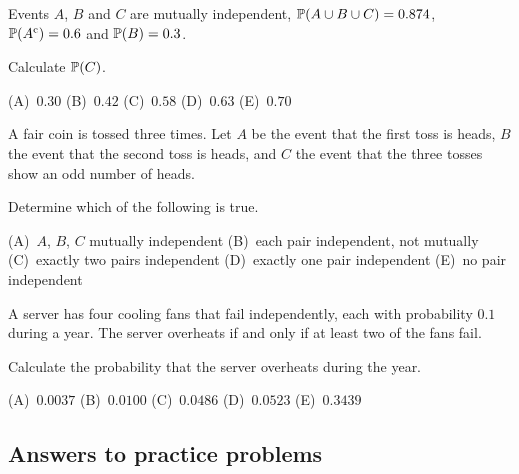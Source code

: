 \begin{practice}
Events $A$, $B$ and $C$ are mutually independent, $\mathbb{P}(A \cup B \cup C) = 0.874$, $\mathbb{P}(A^{\mathrm{c}}) = 0.6$ and $\mathbb{P}(B) = 0.3$.

Calculate $\mathbb{P}(C)$.

\begin{center}
(A)~$0.30$ \quad (B)~$0.42$ \quad (C)~$0.58$ \quad (D)~$0.63$ \quad (E)~$0.70$
\end{center}
\end{practice}

\begin{practice}
A fair coin is tossed three times. Let $A$ be the event that the first toss is heads, $B$ the event that the second toss is heads, and $C$ the event that the three tosses show an odd number of heads.

Determine which of the following is true.

\begin{center}
(A)~$A$, $B$, $C$ mutually independent \quad (B)~each pair independent, not mutually \quad (C)~exactly two pairs independent \quad (D)~exactly one pair independent \quad (E)~no pair independent
\end{center}
\end{practice}

\begin{practice}
A server has four cooling fans that fail independently, each with probability $0.1$ during a year. The server overheats if and only if at least two of the fans fail.

Calculate the probability that the server overheats during the year.

\begin{center}
(A)~$0.0037$ \quad (B)~$0.0100$ \quad (C)~$0.0486$ \quad (D)~$0.0523$ \quad (E)~$0.3439$
\end{center}
\end{practice}

\subsection{Answers to practice problems}

